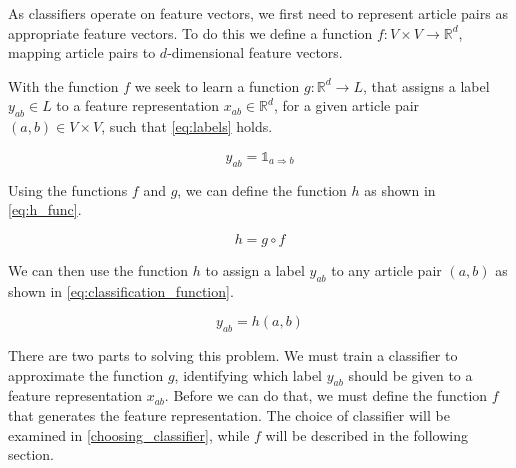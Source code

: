 As classifiers operate on feature vectors, we first need to represent article pairs as appropriate feature vectors. To do this we define a function $f: V\times V \to \mathbb{R}^d$, mapping article pairs to $d$-dimensional feature vectors.

With the function $f$ we seek to learn a function $g: \mathbb{R}^d \to L$, that assigns a label $y_{ab} \in L$ to a feature representation $x_{ab} \in \mathbb{R}^d$, for a given article pair $(a,b) \in V \times V$, such that \cref{eq:labels} holds.

\begin{equation}
\label{eq:labels}
y_{ab}=\mathbb{1}_{a \Rightarrow b}
\end{equation}


Using the functions $f$ and $g$, we can define the function $h$ as shown in \cref{eq:h_func}.

\begin{equation}
\label{eq:h_func}
  h = g \circ f
\end{equation}

 We can then use the function $h$ to assign a label $y_{ab}$ to any article pair $(a,b)$ as shown in \cref{eq:classification_function}.

\begin{equation}
\label{eq:classification_function}
  y_{ab} = h(a,b)
\end{equation}

There are two parts to solving this problem. We must train a classifier to approximate the function $g$, identifying which label $y_{ab}$ should be given to a feature representation $x_{ab}$. Before we can do that, we must define the function $f$ that generates the feature representation. The choice of classifier will be examined in \cref{choosing_classifier}, while $f$ will be described in the following section.



